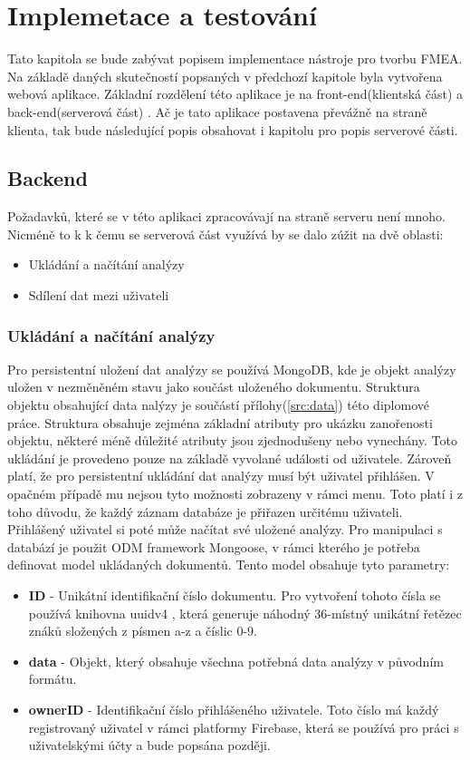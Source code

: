 \chapter{Implemetace a testování}
\label{sec:implementace}
Tato kapitola se bude zabývat popisem implementace nástroje pro tvorbu FMEA. Na základě daných skutečností popsaných v předchozí kapitole byla vytvořena webová aplikace. Základní rozdělení této aplikace je na front-end(klientská část) a back-end(serverová část) . Ač je tato aplikace postavena převážně na straně klienta, tak bude následující popis obsahovat i kapitolu pro popis serverové části.

\section{Backend}
Požadavků, které se v této aplikaci zpracovávají na straně serveru není mnoho. Nicméně to k k čemu se serverová část využívá by se dalo zúžit na dvě oblasti: 
\begin{itemize}
    \item Ukládání a načítání analýzy
    \item Sdílení dat mezi uživateli
\end{itemize}

\subsection{Ukládání a načítání analýzy}
Pro persistentní uložení dat analýzy se používá MongoDB, kde je objekt analýzy uložen v nezměněném stavu jako součást uloženého dokumentu. Struktura objektu obsahující data nalýzy je součástí přílohy(\ref{src:data}) této diplomové práce. Struktura obsahuje zejména základní atributy pro ukázku zanořenosti objektu, některé méně důležité atributy jsou zjednodušeny nebo vynechány. Toto ukládání je provedeno pouze na základě vyvolané události od uživatele. Zároveň platí, že pro persistentní ukládání dat analýzy musí být uživatel přihlášen. V opačném případě mu nejsou tyto možnosti zobrazeny v rámci menu. Toto platí i z toho důvodu, že každý záznam databáze je přiřazen určitému uživateli. Přihlášený uživatel si poté může načítat své uložené analýzy. Pro manipulaci s databází je použit ODM framework Mongoose, v rámci kterého je potřeba definovat model ukládaných dokumentů. Tento model obsahuje tyto parametry: 
\begin{itemize}
    \item \textbf{ID} - Unikátní identifikační číslo dokumentu. Pro vytvoření tohoto čísla se používá knihovna uuidv4 \cite{uuid}, která generuje náhodný 36-místný unikátní řetězec znáků složených z písmen a-z a číslic 0-9.  
    \item \textbf{data} - Objekt, který obsahuje všechna potřebná data analýzy v původním formátu.
    \item \textbf{ownerID} - Identifikační číslo přihlášeného uživatele. Toto číslo má každý registrovaný uživatel v rámci platformy Firebase, která se používá pro práci s uživatelskými účty a bude popsána později. 
\end{itemize}

